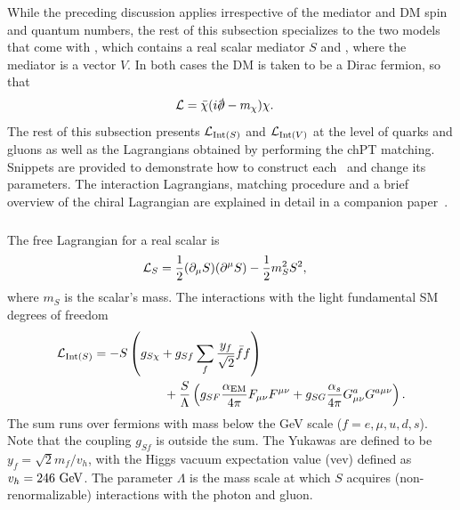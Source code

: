 While the preceding discussion applies irrespective of the mediator and DM spin and quantum numbers, the rest of this subsection specializes to the two models that come with \hazma\: \sm, which contains a real scalar mediator $S$ and \vm, where the mediator is a vector $V$.
 In both cases the DM is taken to be a Dirac fermion, so that
\begin{align}
    \L &= \bar{\chi} (i \slashed \d - m_\chi) \chi.
\end{align}
The rest of this subsection presents $\mathcal{L}_{{\mathrm{Int}}(S)}$ and $\mathcal{L}_{{\mathrm{Int}}(V)}$ at the level of quarks and gluons as well as the Lagrangians obtained by performing the chPT matching. Snippets are provided to demonstrate how to construct each \theory\ and change its parameters. The interaction Lagrangians, matching procedure and a brief overview of the chiral Lagrangian are explained in detail in a companion paper~\cite{matching_paper}.

\subsubsection{\sm}

The free Lagrangian for a real scalar is
\begin{align}
    \mathcal{L}_S &= \frac{1}{2} (\partial_\mu S) (\partial^\mu S) - \frac{1}{2} m_S^2 S^2,
\end{align}
where $m_S$ is the scalar's mass. The interactions with the light fundamental SM degrees of freedom
\begin{align}
    \mathcal{L}_{{\mathrm{Int}}(S)} &= -S \left( g_{S\chi} + g_{Sf} \sum_f \frac{y_f}{\sqrt{2}} \bar{f} f \right)\\
                    &\hspace{2cm} + \frac{S}{\Lambda} \left( g_{SF} \frac{\alpha_{\mathrm{EM}}}{4\pi} F_{\mu\nu} F^{\mu\nu} + g_{SG} \frac{\alpha_s}{4\pi} G_{\mu\nu}^a G^{a \mu\nu} \right).
\end{align}
The sum runs over fermions with mass below the GeV scale ($f = e, \mu, u, d, s$). Note that the coupling $g_{Sf}$ is outside the sum. The Yukawas are defined to be $y_f = \sqrt{2} m_f / v_h$, with the Higgs vacuum expectation value (vev) defined as $v_h = 246{~\mathrm{GeV}}$. The parameter $\Lambda$ is the mass scale at which $S$ acquires (non-renormalizable) interactions with the photon and gluon.

